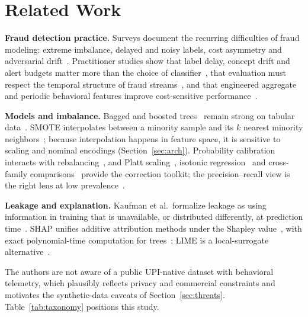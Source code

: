 \documentclass[conference]{IEEEtran}
\begin{document}
\section{Related Work}
\textbf{Fraud detection practice.} Surveys document the recurring difficulties of fraud modeling: extreme imbalance, delayed and noisy labels, cost asymmetry and adversarial drift~\cite{bolton02,phua10,ngai11,chandola09}. Practitioner studies show that label delay, concept drift and alert budgets matter more than the choice of classifier~\cite{dalpozzolo14}, that evaluation must respect the temporal structure of fraud streams~\cite{dalpozzolo18}, and that engineered aggregate and periodic behavioral features improve cost-sensitive performance~\cite{bahnsen16}.

\textbf{Models and imbalance.} Bagged and boosted trees~\cite{breiman01,friedman01,friedman02,chen16} remain strong on tabular data~\cite{grinsztajn22}. SMOTE interpolates between a minority sample and its $k$ nearest minority neighbors~\cite{chawla02}; because interpolation happens in feature space, it is sensitive to scaling and nominal encodings (Section~\ref{sec:arch}). Probability calibration interacts with rebalancing~\cite{dalpozzolo15}, and Platt scaling~\cite{platt99}, isotonic regression~\cite{zadrozny02} and cross-family comparisons~\cite{niculescu05,guo17} provide the correction toolkit; the precision--recall view is the right lens at low prevalence~\cite{davis06,saito15}.

\textbf{Leakage and explanation.} Kaufman et al.\ formalize leakage as using information in training that is unavailable, or distributed differently, at prediction time~\cite{kaufman12}. SHAP unifies additive attribution methods under the Shapley value~\cite{lundberg17,shapley53}, with exact polynomial-time computation for trees~\cite{lundberg20}; LIME is a local-surrogate alternative~\cite{ribeiro16}.

The authors are not aware of a public UPI-native dataset with behavioral telemetry, which plausibly reflects privacy and commercial constraints and motivates the synthetic-data caveats of Section~\ref{sec:threats}. Table~\ref{tab:taxonomy} positions this study.
\end{document}

